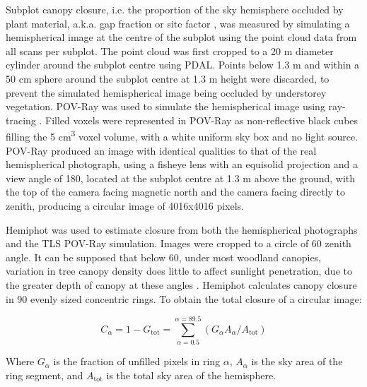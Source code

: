 \documentclass[11pt,a4paper]{article}
\begin{document}
Subplot canopy closure, i.e. the proportion of the sky hemisphere occluded by plant material, a.k.a. gap fraction or site factor \citep{Jennings1999}, was measured by simulating a hemispherical image at the centre of the subplot using the point cloud data from all scans per subplot. The point cloud was first cropped to a 20 m diameter cylinder around the subplot centre using PDAL. Points below 1.3 m and within a 50 cm sphere around the subplot centre at 1.3 m height were discarded, to prevent the simulated hemispherical image being occluded by understorey vegetation. POV-Ray was used to simulate the hemispherical image using ray-tracing \citep{Povray2004}. Filled voxels were represented in POV-Ray as non-reflective black cubes filling the 5 cm\textsuperscript{3} voxel volume, with a white uniform sky box and no light source. POV-Ray produced an image with identical qualities to that of the real hemispherical photograph, using a fisheye lens with an equisolid projection and a view angle of 180\textdegree, located at the subplot centre at 1.3 m above the ground, with the top of the camera facing magnetic north and the camera facing directly to zenith, producing a circular image of 4016x4016 pixels.

Hemiphot \citep{HemiPhot} was used to estimate closure from both the hemispherical photographs and the TLS POV-Ray simulation. Images were cropped to a circle of 60\textdegree{} zenith angle. It can be supposed that below 60\textdegree{}, under most woodland canopies, variation in tree canopy density does little to affect sunlight penetration, due to the greater depth of canopy at these angles \citep{Jupp2008}. Hemiphot calculates canopy closure in 90 evenly sized concentric rings. To obtain the total closure of a circular image:

\begin{equation}
	C_{\alpha{}} = 1 - G_{\text{tot}} = \sum_{\alpha{} = 0.5}^{\alpha{} = 89.5}(G_{\alpha{}} A_{\alpha{}} / A_{\text{tot}})
\end{equation}

Where $G_{\alpha{}}$ is the fraction of unfilled pixels in ring $\alpha{}$, $A_{\alpha{}}$ is the sky area of the ring segment, and $A_{\text{tot}}$ is the total sky area of the hemisphere.
\end{document}
